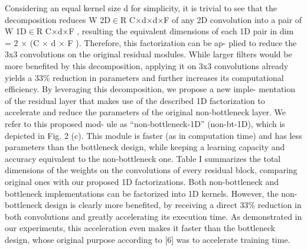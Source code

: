 Considering an equal kernel size d for simplicity, it is trivial
to see that the decomposition reduces W 2D$\in$R C×d×d×F
of any 2D convolution into a pair of W 1D$\in$R C×d×F ,
resulting the equivalent dimensions of each 1D pair in dim =
2 × (C × d × F ). Therefore, this factorization can be ap-
plied to reduce the 3x3 convolutions on the original residual
modules. While larger filters would be more benefited by
this decomposition, applying it on 3x3 convolutions already
yields a 33\% reduction in parameters and further increases its
computational efficiency.
By leveraging this decomposition, we propose a new imple-
mentation of the residual layer that makes use of the described
1D factorization to accelerate and reduce the parameters of the
original non-bottleneck layer. We refer to this proposed mod-
ule as “non-bottleneck-1D” (non-bt-1D), which is depicted in
Fig. 2 (c). This module is faster (as in computation time)
and has less parameters than the bottleneck design, while
keeping a learning capacity and accuracy equivalent to the
non-bottleneck one. Table I summarizes the total dimensions
of the weights on the convolutions of every residual block,
comparing original ones with our proposed 1D factorizations.
Both non-bottleneck and bottleneck implementations can be
factorized into 1D kernels. However, the non-bottleneck design
is clearly more benefited, by receiving a direct 33\% reduction
in both convolutions and greatly accelerating its execution
time. As demonstrated in our experiments, this acceleration
even makes it faster than the bottleneck design, whose original
purpose according to [6] was to accelerate training time.

